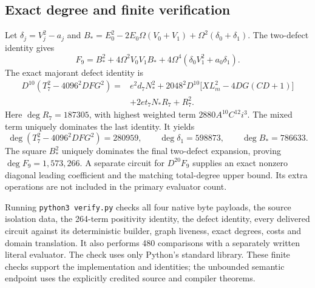 \subsection{Exact degree and finite verification}

Let \(\delta_j=V_j^2-a_j\) and
\(B_*=E_0^2-2E_0\Omega(V_0+V_1)+\Omega^2(\delta_0+\delta_1)\).
The two-defect identity gives
\[
 F_9=B_*^2+4\Omega^2V_0V_1B_*
          +4\Omega^4(\delta_0V_1^2+a_0\delta_1).
\]
The exact majorant defect identity is
\begin{align*}
 D^{10}(T_7^2-4096^2DFG^2)
  ={}&e^2d_7N_*^2
     +2048^2D^{10}\bigl[XL_m^2-4DG(CD+1)\bigr]\\
    &+2et_7N_*R_7+R_7^2.
\end{align*}
Here \(\deg R_7=187305\), with highest weighted term
\(2880A^{10}C^{12}i^3\).  The mixed term uniquely dominates the last
identity.  It yields
\[
 \deg(T_7^2-4096^2DFG^2)=280959,\qquad
 \deg\delta_1=598873,\qquad \deg B_*=786633.
\]
The square \(B_*^2\) uniquely dominates the final two-defect expansion,
proving \(\deg F_9=1{,}573{,}266\).  A separate circuit for
\(D^{20}F_9\) supplies an exact nonzero diagonal leading coefficient
and the matching total-degree upper bound.  Its extra operations are not
included in the primary evaluator count.

Running \texttt{python3 verify.py} checks all four native byte payloads,
the source isolation data, the 264-term positivity identity, the defect
identity, every delivered circuit against its deterministic builder,
graph liveness, exact degrees, costs and domain translation.  It also
performs 480 comparisons with a separately written literal evaluator.
The check uses only Python's standard library.  These finite checks support
the implementation and identities; the unbounded semantic endpoint uses
the explicitly credited source and compiler theorems.
